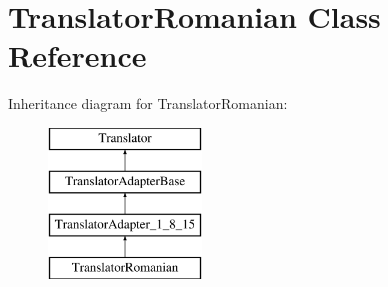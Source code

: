 \hypertarget{class_translator_romanian}{}\section{Translator\+Romanian Class Reference}
\label{class_translator_romanian}
Inheritance diagram for Translator\+Romanian\+:\begin{figure}[H]
\begin{center}
\leavevmode
\includegraphics[height=4.000000cm]{class_translator_romanian}
\end{center}
\end{figure}
